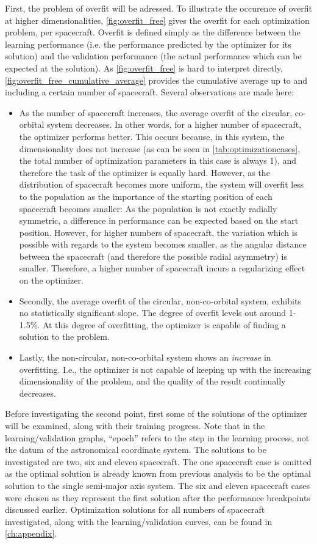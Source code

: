 First, the problem of overfit will be adressed. To illustrate the occurence of overfit at higher dimensionalities, \autoref{fig:overfit_free} gives the overfit for each optimization problem, per spacecraft. Overfit is defined simply as the difference between the learning performance (i.e. the performance predicted by the optimizer for its solution) and the validation performance (the actual performance which can be expected at the solution). As \autoref{fig:overfit_free} is hard to interpret directly, \autoref{fig:overfit_free_cumulative_average} provides the cumulative average up to and including a certain number of spacecraft. Several observations are made here:
\begin{itemize}
 \item As the number of spacecraft increases, the average overfit of the circular, co-orbital system decreases. In other words, for a higher number of spacecraft, the optimizer performs better. This occurs because, in this system, the dimensionality does not increase (as can be seen in \autoref{tab:optimizationcases}, the total number of optimization parameters in this case is always 1), and therefore the task of the optimizer is equally hard. However, as the distribution of spacecraft becomes more uniform, the system will overfit less to the population as the importance of the starting position of each spacecraft becomes smaller: As the population is not exactly radially symmetric, a difference in performance can be expected based on the start position. However, for higher numbers of spacecraft, the variation which is possible with regards to the system becomes smaller, as the angular distance between the spacecraft (and therefore the possible radial asymmetry) is smaller. Therefore, a higher number of spacecraft incurs a regularizing effect on the optimizer.
 \item Secondly, the average overfit of the circular, non-co-orbital system, exhibits no statistically significant slope. The degree of overfit levels out around 1-1.5\%. At this degree of overfitting, the optimizer is capable of finding a solution to the problem.
 \item Lastly, the non-circular, non-co-orbital system shows an \textit{increase} in overfitting. I.e., the optimizer is not capable of keeping up with the increasing dimensionality of the problem, and the quality of the result continually decreases.
\end{itemize}
Before investigating the second point, first some of the solutions of the optimizer will be examined, along with their training progress. Note that in the learning/validation graphs, ``epoch'' refers to the step in the learning process, not the datum of the astronomical coordinate system. The solutions to be investigated are two, six and eleven spacecraft. The one spacecraft case is omitted as the optimal solution is already known from previous analysis to be the optimal solution to the single semi-major axis system. The six and eleven spacecraft cases were chosen as they represent the first solution after the performance breakpoints discussed earlier. Optimization solutions for all numbers of spacecraft investigated, along with the learning/validation curves, can be found in \autoref{ch:appendix}.
